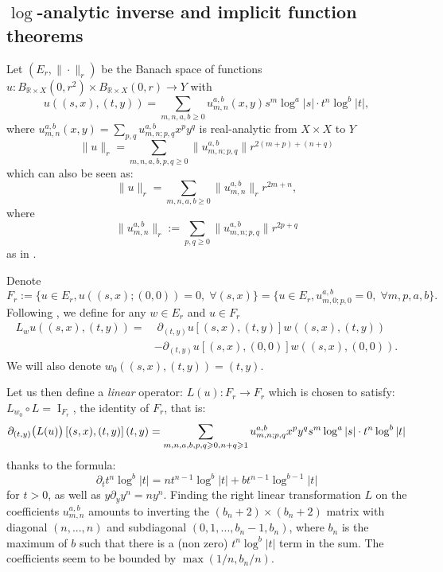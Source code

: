\documentclass[12pt]{article}
\begin{document}
    
    \subsection{$\log$-analytic inverse and implicit function theorems}
    
    Let $(E_r,\|\cdot\|_r)$ be the Banach space of functions $u: B_{\mathbb{R}\times X}(0,r^2)\times B_{\mathbb{R}\times X}(0,r)\to Y$ with 
    $$ u\left((s,x),(t,y)\right) = \sum_{m,n,a,b\geqslant 0} u_{m,n}^{a,b}(x,y)s^m\log^a|s|\cdot t^n\log^b|t|, $$
    where $u_{m,n}^{a,b}(x,y) = \sum_{p,q} u_{m,n;p,q}^{a,b}x^py^q$ is real-analytic from $X\times X$ to $Y$
    $$\|u\|_r = \sum_{m,n,a,b,p,q\geqslant 0} \|u_{m,n;p,q}^{a,b}\|r^{2(m+p)+(n+q)}$$
    which can also be seen as:
    $$\|u\|_r = \sum_{m,n,a,b\geqslant 0} \|u_{m,n}^{a,b}\|_r r^{2m+n},$$
    where $$\|u_{m,n}^{a,b}\|_r:= \sum_{p,q\geqslant 0}\|u_{m,n;p,q}^{a,b}\|r^{2p+q}$$
    as in \cite{bt}.
    
    Denote $$F_r:=\{u\in E_r, u((s,x);(0,0))=0,\; \forall (s,x)\} =  \{u\in E_r, u_{m,0;p,0}^{a,b}=0, \; \forall m,p,a,b\}.$$ 
    Following \cite{bt}, we define for any $w\in E_r$ and $u\in F_r$
    \begin{align*}
        L_wu((s,x),(t,y)) =&\; \partial_{(t,y)} u\left[(s,x),(t,y)\right] w ((s,x),(t,y)) \\
        &-\partial_{(t,y)}u\left[(s,x),(0,0)\right] w ((s,x),(0,0)).
    \end{align*}
    We will also denote $w_0((s,x),(t,y)) = (t,y)$.
    
    Let us then define a \emph{linear} operator:
    $L(u): F_r\to F_r$
    which is chosen to satisfy: $ L_{w_0} \circ L = \operatorname{I}_{F_r}$, the identity of $F_r$, that is:
    \begin{equation}
        \partial_{(t,y)} \big(L(u)\big)\left[(s,x),(t,y)\right](t,y) = \sum_{m,n,a,b,p,q\geqslant 0,\\ n+q\geqslant1} u_{m,n;p,q}^{a,b} x^py^qs^m\log^a|s|\cdot
             t^n\log^b|t|\label{prop Lu}
    \end{equation}
    thanks to the formula:
    $$ \partial_{t} t^n\log^b|t| = nt^{n-1}\log^{b}|t| + bt^{n-1}\log^{b-1}|t|$$
    for $t>0$, as well as $ y\partial_yy^n = n y^n$. Finding the right linear transformation $L$ on the coefficients $u_{m,n}^{a,b}$ amounts to inverting the $(b_n+2)\times (b_n+2)$ matrix with diagonal $(n,...,n)$ and subdiagonal $(0,1,...,b_n-1,b_n)$, where $b_n$ is the maximum of $b$ such that there is a (non zero) $t^n\log^b|t|$ term in the sum. The coefficients seem to be bounded by $\max(1/n,b_n/n)$.
    
\end{document}

